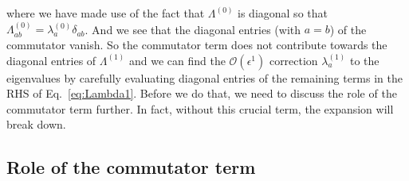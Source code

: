 %
where we have made use of the fact that $\Lambda^{(0)}$ is diagonal so that $\Lambda^{(0)}_{ab} = \lambda^{(0)}_{a}\delta_{ab}$.
And we see that the diagonal entries (with $a=b$) of the commutator vanish.
So the commutator term does not contribute towards the diagonal entries of $\Lambda^{(1)}$ and we can find the $\mathcal{O}(\epsilon^{1})$ correction $\lambda^{(1)}_{a}$ to the eigenvalues by carefully evaluating diagonal entries of the remaining terms in the RHS of Eq.~\eqref{eq:Lambda1}.
Before we do that, we need to discuss the role of the commutator term further.
In fact, without this crucial term, the expansion will break down.

\subsection{Role of the commutator term}

